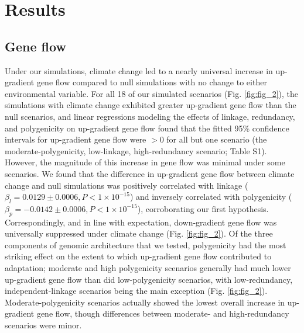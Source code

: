 \documentclass[9pt,twocolumn,twoside,lineno]{new_article}
\begin{document}
\section*{Results}

\subsection*{Gene flow}
Under our simulations, climate change led to a nearly universal increase in up-gradient gene flow
compared to null simulations with no change to either environmental variable. For all 18 of our simulated scenarios (Fig. \ref{fig:fig_2}), the simulations with climate change exhibited greater up-gradient gene flow than the null scenarios, and linear regressions modeling the effects of linkage, redundancy, and polygenicity on up-gradient gene flow found that the 
fitted 95\% confidence intervals for up-gradient gene flow were $>0$ for all but
one scenario (the moderate-polygenicity, low-linkage, high-redundancy scenario; Table S1).
However, the magnitude of this increase in gene flow was minimal under
some scenarios. We found that the difference in up-gradient gene flow between climate change and null simulations was positively correlated with linkage
($\beta_{l} = 0.0129\pm0.0006, P<1\times10^{-15}$)
and inversely correlated with polygenicity
($\beta_{p} = -0.0142\pm0.0006, P<1\times10^{-15}$),
corroborating our first hypothesis.
Correspondingly, and in line with expectation, down-gradient gene flow was 
universally suppressed under climate change (Fig. \ref{fig:fig_2}).
Of the three components of genomic architecture that we tested,
polygenicity had the most striking effect on the extent to which
up-gradient gene flow contributed to adaptation;
moderate and high polygenicity scenarios generally had much lower
up-gradient gene flow than did low-polygenicity scenarios,
with low-redundancy, independent-linkage scenarios being the main exception (Fig. \ref{fig:fig_2}).
Moderate-polygenicity scenarios actually showed the lowest overall increase
in up-gradient gene flow, though differences between moderate- and
high-redundancy scenarios were minor.
\end{document}
